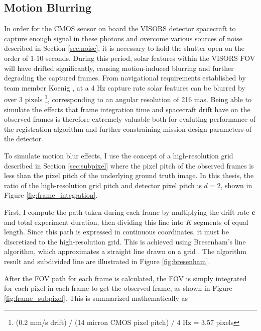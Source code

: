 \documentclass[tocnosub,noragright,centerchapter,12pt]{uiucecethesis09}
\begin{document}
\subsection{Motion Blurring} \label{sec:motion}


In order for the CMOS sensor on board the VISORS detector spacecraft to capture enough signal in these photons and overcome various sources of noise described in Section \ref{sec:noise}, it is necessary to hold the shutter open on the order of 1-10 seconds.  During this period, solar features within the VISORS FOV will have drifted significantly, causing motion-induced blurring and further degrading the captured frames.  From navigational requirements established by team member Koenig \cite{koenig}, at a 4 Hz capture rate solar features can be blurred by over 3 pixels \footnote{(0.2 mm/s drift) / (14 micron CMOS pixel pitch) / 4 Hz = 3.57 pixels}, corresponding to an angular resolution of 216 mas.  Being able to simulate the effects that frame integration time and spacecraft drift have on the observed frames is therefore extremely valuable both for evaluting performance of the registration algorithm and further constraining mission design parameters of the detector.

To simulate motion blur effects, I use the concept of a high-resolution grid described in Section \ref{sec:subpixel} where the pixel pitch of the observed frames is less than the pixel pitch of the underlying ground truth image.  In this thesis, the ratio of the high-resolution grid pitch and detector pixel pitch is $d=2$, shown in Figure \ref{fig:frame_integration}.

First, I compute the path taken during each frame by multiplying the drift rate $\bm{c}$ and total experiment duration, then dividing this line into $K$ segments of equal length.  Since this path is expressed in continuous coordinates, it must be discretized to the high-resolution grid.  This is achieved using Bresenham's line algorithm, which approximates a straight line drawn on a grid \cite{bresenham}.  The algorithm result and subdivided line are illustrated in Figure \ref{fig:bresenham}.

After the FOV path for each frame is calculated, the FOV is simply integrated for each pixel in each frame to get the observed frame, as shown in Figure \ref{fig:frame_subpixel}.  This is summarized mathematically as
\end{document}
